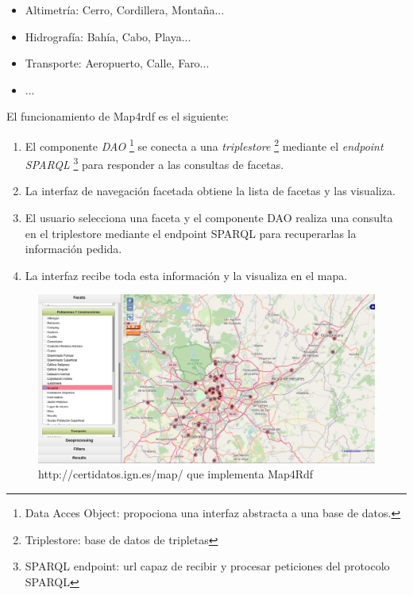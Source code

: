 \begin{itemize}
    \item Altimetría: Cerro, Cordillera, Montaña...
    \item Hidrografía: Bahía, Cabo, Playa...
    \item Transporte: Aeropuerto, Calle, Faro...
    \item ...
\end{itemize}

El funcionamiento de Map4rdf es el siguiente:
\begin{enumerate}

    \item El componente \textit{DAO} \footnote{Data Acces Object: propociona una interfaz abstracta a una base de
        datos.} se conecta a una \textit{triplestore} \footnote{Triplestore: base de datos de tripletas} mediante
        el \textit{endpoint SPARQL} \footnote{SPARQL endpoint: url capaz de recibir y procesar peticiones del
        protocolo SPARQL} para responder a las consultas de facetas. 

    \item La interfaz de navegación facetada obtiene la lista de facetas y las visualiza. 

    \item El usuario selecciona una faceta y el componente DAO realiza una consulta en el
        triplestore mediante el endpoint SPARQL para recuperarlas la información pedida.

    \item La interfaz recibe toda esta información y la visualiza en el mapa.

\end{enumerate}

\begin{figure}[H]
    \includegraphics[width=\textwidth]{images/map4rdf.png}
    \centering
    \caption{http://certidatos.ign.es/map/ que implementa Map4Rdf}
    \label{fig:map4rdf}
\end{figure}


